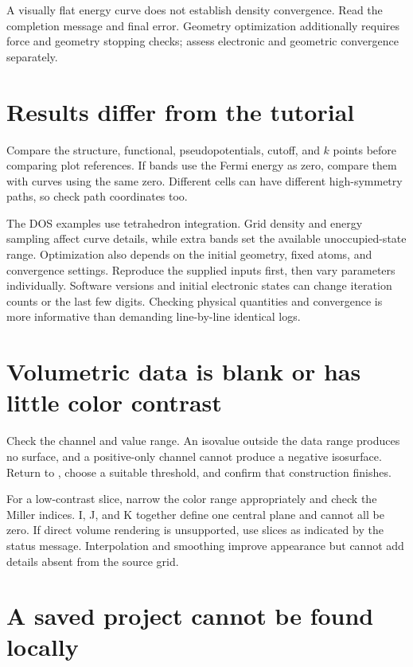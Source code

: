 A visually flat energy curve does not establish density convergence. Read the completion message and final error. Geometry optimization additionally requires force and geometry stopping checks; assess electronic and geometric convergence separately.

\section{Results differ from the tutorial}

Compare the structure, functional, pseudopotentials, cutoff, and $k$ points before comparing plot references. If bands use the Fermi energy as zero, compare them with curves using the same zero. Different cells can have different high-symmetry paths, so check path coordinates too.

The DOS examples use tetrahedron integration. Grid density and energy sampling affect curve details, while extra bands set the available unoccupied-state range. Optimization also depends on the initial geometry, fixed atoms, and convergence settings. Reproduce the supplied inputs first, then vary parameters individually. Software versions and initial electronic states can change iteration counts or the last few digits. Checking physical quantities and convergence is more informative than demanding line-by-line identical logs.

\section{Volumetric data is blank or has little color contrast}

Check the channel and value range. An isovalue outside the data range produces no surface, and a positive-only channel cannot produce a negative isosurface. Return to , choose a suitable threshold, and confirm that construction finishes.

For a low-contrast slice, narrow the color range appropriately and check the Miller indices. I, J, and K together define one central plane and cannot all be zero. If direct volume rendering is unsupported, use slices as indicated by the status message. Interpolation and smoothing improve appearance but cannot add details absent from the source grid.

\section{A saved project cannot be found locally}

